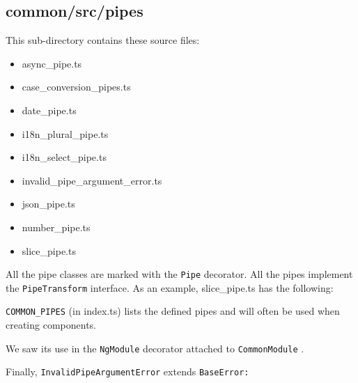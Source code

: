\subsection{common/src/pipes}

This sub-directory contains these source files:

\begin{itemize}
  \item async\_pipe.ts
  \item case\_conversion\_pipes.ts
  \item date\_pipe.ts
  \item i18n\_plural\_pipe.ts
  \item i18n\_select\_pipe.ts
  \item invalid\_pipe\_argument\_error.ts
  \item json\_pipe.ts
  \item number\_pipe.ts
  \item slice\_pipe.ts
\end{itemize}

All the pipe classes are marked with the
\texttt{Pipe}
decorator. All the pipes implement the
\texttt{PipeTransform}
interface. As an example, slice\_pipe.ts has the following:



\texttt{COMMON\_PIPES}
(in index.ts) lists the defined pipes and will often be used when
creating components.



We saw its use in the
\texttt{NgModule}
decorator attached to
\texttt{CommonModule}
.

Finally,
\texttt{InvalidPipeArgumentError}
extends
\texttt{BaseError:}


